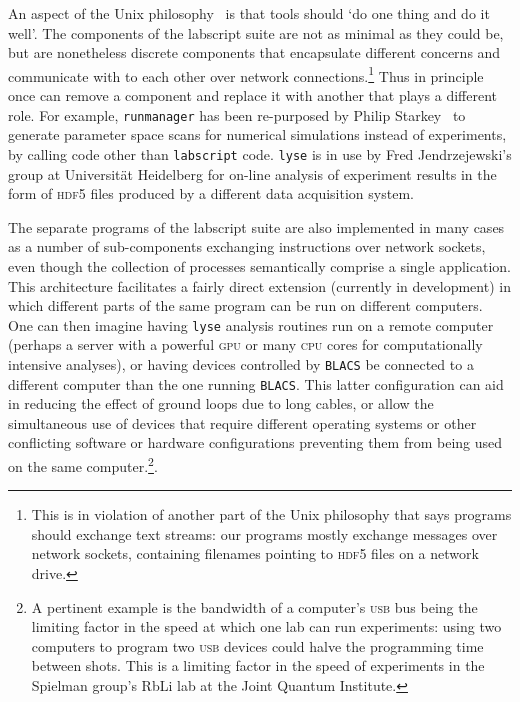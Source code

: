 An aspect of the Unix philosophy~\cite{gancarz_unix_1995} is that tools should `do one thing and do it well'. The components of the labscript suite are not as minimal as they could be, but are nonetheless discrete components that encapsulate different concerns and communicate with to each other over network connections.\footnote{This is in violation of another part of the Unix philosophy that says programs should exchange text streams: our programs mostly exchange messages over network sockets, containing filenames pointing to \textsc{hdf5} files on a network drive.} Thus in principle once can remove a component and replace it with another that plays a different role. For example, \texttt{runmanager} has been re-purposed by Philip Starkey~\cite{starkey_thesis_2018} to generate parameter space scans for numerical simulations instead of experiments, by calling code other than \texttt{labscript} code. \texttt{lyse} is in use by Fred Jendrzejewski's group at Universit\"at Heidelberg for on-line analysis of experiment results in the form of \textsc{hdf5} files produced by a different data acquisition system.

The separate programs of the labscript suite are also implemented in many cases as a number of sub-components exchanging instructions over network sockets, even though the collection of processes semantically comprise a single application. This architecture facilitates a fairly direct extension (currently in development) in which different parts of the same program can be run on different computers. One can then imagine having \texttt{lyse} analysis routines run on a remote computer (perhaps a server with a powerful \textsc{gpu} or many \textsc{cpu} cores for computationally intensive analyses), or having devices controlled by \texttt{BLACS} be connected to a different computer than the one running \texttt{BLACS}. This latter configuration can aid in reducing the effect of ground loops due to long cables, or allow the simultaneous use of devices that require different operating systems or other conflicting software or hardware configurations preventing them from being used on the same computer.\footnote{A pertinent example is the bandwidth of a computer's \textsc{usb} bus being the limiting factor in the speed at which one lab can run experiments: using two computers to program two \textsc{usb} devices could halve the programming time between shots. This is a limiting factor in the speed of experiments in the Spielman group's RbLi lab at the Joint Quantum Institute.}.

